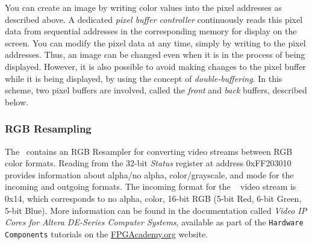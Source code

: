 You can create an image by writing color values into the pixel addresses as described
above. A dedicated {\it pixel buffer controller} continuously reads this pixel 
data from sequential addresses in the corresponding
memory for display on the screen.  You can modify the pixel data at any time, simply
by writing to the pixel addresses. Thus, an image can be changed even when it is in the
process of being displayed.  However, it is also possible to avoid making changes to 
the pixel buffer while it is being displayed, by using the concept of {\it
double-buffering}.  In this scheme, two pixel buffers are involved, called the {\it front} 
and {\it back} buffers, described below.

\subsubsection{RGB Resampling}
The \systemName~contains an RGB Resampler for converting video streams between RGB color
formats. Reading from the 32-bit \textit{Status} register at address {\sf 0xFF203010}
provides information about alpha/no alpha, color/grayscale, and mode for the incoming and
outgoing formats. The incoming format for the \systemName~ video stream is {\sf 0x14},
which corresponds to no alpha, color, 16-bit RGB (5-bit Red, 6-bit Green, 5-bit Blue).
More information can be found in the documentation called 
{\it Video IP Cores for Altera DE-Series Computer Systems}, available as part of the
\texttt{Hardware Components} tutorials on the 
{\small \href{https://www.fpgacademy.org/tutorials.html} {FPGAcademy.org}} website.
